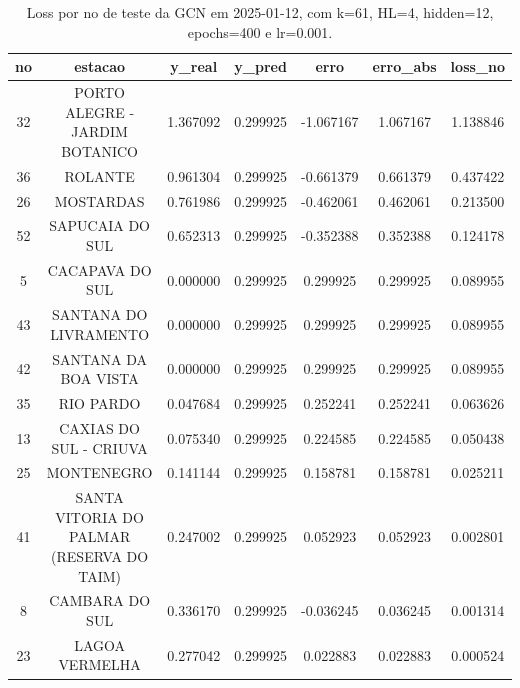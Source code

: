 \begin{table}[h]
\centering
\caption{Loss por no de teste da GCN em 2025-01-12, com k=61, HL=4, hidden=12, epochs=400 e lr=0.001.}
\label{tab:gcn_loss_k61_hl4_h12_e400_d20250112}
\begin{tabular}{ccccccc}
\toprule
no & estacao & y\_real & y\_pred & erro & erro\_abs & loss\_no \\
\midrule
32 & PORTO ALEGRE - JARDIM BOTANICO & 1.367092 & 0.299925 & -1.067167 & 1.067167 & 1.138846 \\
36 & ROLANTE & 0.961304 & 0.299925 & -0.661379 & 0.661379 & 0.437422 \\
26 & MOSTARDAS & 0.761986 & 0.299925 & -0.462061 & 0.462061 & 0.213500 \\
52 & SAPUCAIA DO SUL & 0.652313 & 0.299925 & -0.352388 & 0.352388 & 0.124178 \\
5 & CACAPAVA DO SUL & 0.000000 & 0.299925 & 0.299925 & 0.299925 & 0.089955 \\
43 & SANTANA DO LIVRAMENTO & 0.000000 & 0.299925 & 0.299925 & 0.299925 & 0.089955 \\
42 & SANTANA DA BOA VISTA & 0.000000 & 0.299925 & 0.299925 & 0.299925 & 0.089955 \\
35 & RIO PARDO & 0.047684 & 0.299925 & 0.252241 & 0.252241 & 0.063626 \\
13 & CAXIAS DO SUL - CRIUVA & 0.075340 & 0.299925 & 0.224585 & 0.224585 & 0.050438 \\
25 & MONTENEGRO & 0.141144 & 0.299925 & 0.158781 & 0.158781 & 0.025211 \\
41 & SANTA VITORIA DO PALMAR (RESERVA DO TAIM) & 0.247002 & 0.299925 & 0.052923 & 0.052923 & 0.002801 \\
8 & CAMBARA DO SUL & 0.336170 & 0.299925 & -0.036245 & 0.036245 & 0.001314 \\
23 & LAGOA VERMELHA & 0.277042 & 0.299925 & 0.022883 & 0.022883 & 0.000524 \\
\bottomrule
\end{tabular}
\end{table}
